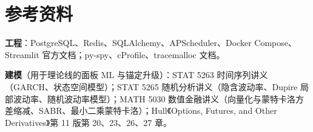 \documentclass[11pt]{ctexart}
\begin{document}
\section{参考资料}

\textbf{工程}：PostgreSQL、Redis、SQLAlchemy、APScheduler、Docker Compose、Streamlit 官方文档；py-spy、cProfile、tracemalloc 文档。

\textbf{建模}（用于理论线的面板 ML 与锚定升级）：STAT 5263 时间序列讲义（GARCH、状态空间模型）；STAT 5265 随机分析讲义（隐含波动率、Dupire 局部波动率、随机波动率模型）；MATH 5030 数值金融讲义（向量化与蒙特卡洛方差缩减、SABR、最小二乘蒙特卡洛）；Hull《Options, Futures, and Other Derivatives》第 11 版第 20、23、26、27 章。
\end{document}
